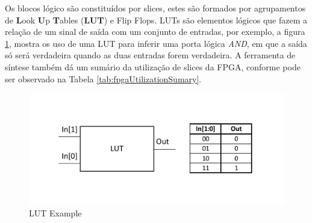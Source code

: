 \documentclass[monografia]{subfiles}
\begin{document}
		Os blocos lógico são constituídos por slices, estes são formados por agrupamentos de \textbf{L}ook \textbf{U}p \textbf{T}ables (\textbf{LUT}) e Flip Flops.
		LUTs são elementos lógicos que fazem a relação de um sinal de saída com um conjunto de entradas, por exemplo, a figura \ref{fig:lutExample}, mostra
		os uso de uma LUT para inferir uma porta lógica \textit{AND}, em que a saída só será verdadeira quando as duas entradas forem verdadeira.
		A ferramenta de síntese também dá um sumário da utilização de slices da FPGA,
		conforme pode ser observado na Tabela \ref{tab:fpgaUtilizationSumary}.

			\begin{figure}[!h]
			\centering
				\includegraphics[scale=1.5]{img/lutExample.pdf}
			\caption{LUT Example}
			\label{fig:lutExample}
			\end{figure}
\end{document}
